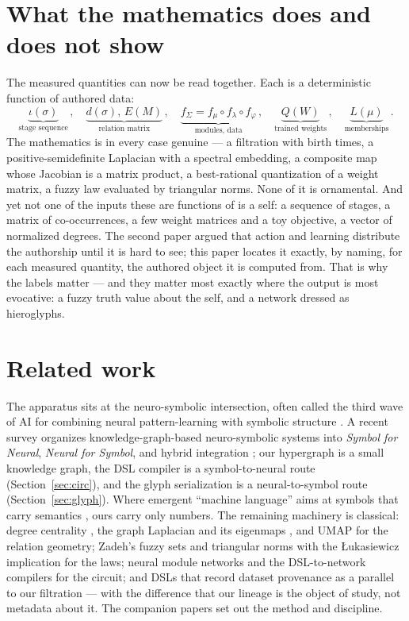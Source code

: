 \documentclass[11pt]{article}
\begin{document}
\section{What the mathematics does and does not show}
The measured quantities can now be read together. Each is a deterministic function
of authored data:
\begin{equation}
\underbrace{\iota(\sigma)}_{\text{stage sequence}}\,,\quad
\underbrace{d(\sigma),\,E(M)}_{\text{relation matrix}}\,,\quad
\underbrace{f_\Sigma=f_\mu\circ f_\lambda\circ f_\varphi}_{\text{modules, data}}\,,\quad
\underbrace{Q(W)}_{\text{trained weights}}\,,\quad
\underbrace{L(\mu)}_{\text{memberships}}\,.
\end{equation}
The mathematics is in every case genuine --- a filtration with birth times, a
positive-semidefinite Laplacian with a spectral embedding, a composite map whose
Jacobian is a matrix product, a best-rational quantization of a weight matrix, a
fuzzy law evaluated by triangular norms. None of it is ornamental. And yet not one
of the inputs these are functions of is a self: a sequence of stages, a matrix of
co-occurrences, a few weight matrices and a toy objective, a vector of normalized
degrees. The second paper argued that action and learning distribute the authorship
until it is hard to see; this paper locates it exactly, by naming, for each
measured quantity, the authored object it is computed from. That is why the labels
matter --- and they matter most exactly where the output is most evocative: a fuzzy
truth value about the self, and a network dressed as hieroglyphs.

\section{Related work}
The apparatus sits at the neuro-symbolic intersection, often called the third wave
of AI for combining neural pattern-learning with symbolic structure
\cite{neurosym}. A recent survey organizes knowledge-graph-based neuro-symbolic
systems into \emph{Symbol for Neural}, \emph{Neural for Symbol}, and hybrid
integration \cite{kgns}; our hypergraph is a small knowledge graph, the DSL
compiler is a symbol-to-neural route (Section~\ref{sec:circ}), and the glyph
serialization is a neural-to-symbol route (Section~\ref{sec:glyph}). Where
emergent ``machine language'' aims at symbols that carry semantics
\cite{machinelang}, ours carry only numbers. The remaining machinery is classical:
degree centrality \cite{freeman}, the graph Laplacian and its eigenmaps
\cite{laplacian}, and UMAP \cite{umap} for the relation geometry; Zadeh's fuzzy
sets \cite{zadeh} and triangular norms with the \L ukasiewicz implication
\cite{tnorms} for the laws; neural module networks \cite{nmn} and the
DSL-to-network compilers \cite{deepdsl,semkis,hinkel} for the circuit; and DSLs
that record dataset provenance \cite{ginermiguelez} as a parallel to our filtration
--- with the difference that our lineage is the object of study, not metadata about
it. The companion papers \cite{paper1,paper2} set out the method and discipline.
\end{document}
